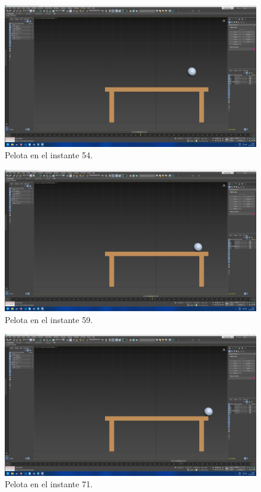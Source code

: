 \documentclass{article}
\begin{document}
\begin{figure}[H]
    \centering
    \includegraphics[width=\textwidth]{imagenes/Ejercicio3/keyframes/54.png}
    \caption{Pelota en el instante 54.}
\end{figure}
\begin{figure}[H]
    \centering
    \includegraphics[width=\textwidth]{imagenes/Ejercicio3/keyframes/59.png}
    \caption{Pelota en el instante 59.}
\end{figure}
\begin{figure}[H]
    \centering
    \includegraphics[width=\textwidth]{imagenes/Ejercicio3/keyframes/71.png}
    \caption{Pelota en el instante 71.}
\end{figure}
\end{document}

